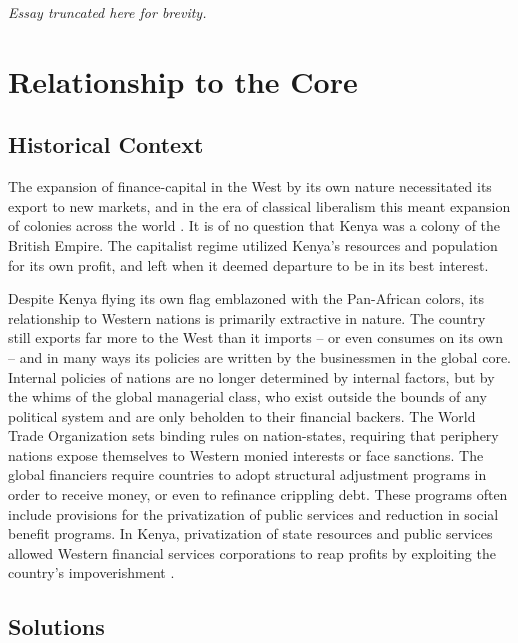 \documentclass[american]{../../../coursework}
\begin{document}
\vspace{1em}

\phantom{*}\hfill\hfill\hfill*\hfill*\hfill*\hfill\hfill\hfill\phantom{*}

\vspace{1em}

\textit{Essay truncated here for brevity.}

\iffalse

\section{Relationship to the Core}
\subsection{Historical Context}

The expansion of finance-capital in the West by its own nature necessitated
its export to new markets, and in the era of classical liberalism this meant
expansion of colonies across the world \parencite{Lenin1917}. It is of no
question that Kenya was a colony of the British Empire. The capitalist regime
utilized Kenya's resources and population for its own profit, and left when it
deemed departure to be in its best interest.

Despite Kenya flying its own flag emblazoned with the Pan-African colors, its
relationship to Western nations is primarily extractive in nature. The country
still exports far more to the West than it imports -- or even consumes on its
own -- and in many ways its policies are written by the businessmen in the
global core. Internal policies of nations are no longer determined by internal
factors, but by the whims of the global managerial class, who exist outside
the bounds of any political system and are only beholden to their financial
backers. The World Trade Organization sets binding rules on nation-states,
requiring that periphery nations expose themselves to Western monied interests
or face sanctions. The global financiers require countries to adopt structural
adjustment programs in order to receive money, or even to refinance crippling
debt. These programs often include provisions for the privatization of public
services and reduction in social benefit programs. In Kenya, privatization of
state resources and public services allowed Western financial services
corporations to reap profits by exploiting the country's impoverishment
\parencite{McMichael2004}.


\subsection{Solutions}
\end{document}
